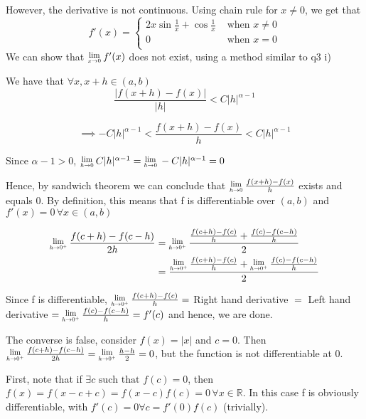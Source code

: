 \documentclass{article}
\newcommand{\Lim}[1]{\raisebox{0.5ex}{\scalebox{0.8}{$\displaystyle \lim_{#1}\;$}}}
\begin{document}
        However, the derivative is not continuous. Using chain rule for $x\neq 0$, we get that 
        $$f'(x) = \begin{cases}
                    2x \sin \frac{1}{x}+ \cos \frac{1}{x} &  \text{ when } x \neq 0\\
                    0 &  \text{ when } x = 0\\
                \end{cases}
                $$
                We can show that $\Lim{x\to 0} f'(x)$ does not exist, using a method similar to q3 i)

        \item We have that $\forall x,x+h \in (a,b)$
                $$\frac{|f(x+h) - f(x)|}{|h|} < C |h|^{\alpha-1}$$

                $$\implies -C|h|^{\alpha-1} < \frac{f(x+h) - f(x)}{h} < C |h|^{\alpha-1}$$

                Since $\alpha -1 > 0$, $\Lim{h \to 0} C|h|^{\alpha-1} = \Lim{h \to 0} -C|h|^{\alpha-1} = 0$

                Hence, by sandwich theorem we can conclude that $\Lim{h\to 0}\frac{f(x+h) - f(x)}{h}$ exists and equals $0$. By definition, this means that f is differentiable over $(a, b)$ and $f'(x) = 0 \, \forall x \in (a,b)$

        \item

                \begin{align*}\Lim{h\to 0^+} \frac{f(c+h) - f(c-h)}{2h} &= \Lim{h\to 0^+}\frac{\frac{f(c+h)-f(c)}{h} + \frac{f(c) - f(c-h)}{h}}{2}\\ 
                                                                       &= \frac{\Lim{h\to 0^+}\frac{f(c+h)-f(c)}{h} + \Lim{h\to 0^+}\frac{f(c) - f(c-h)}{h}}{2}\\
                \end{align*}
               
                Since f is differentiable, $\Lim{h\to 0^+}\frac{f(c+h)-f(c)}{h} = $ Right hand derivative $ = $ Left hand derivative $ = \Lim{h\to 0^+}\frac{f(c) - f(c-h)}{h} = f'(c)$ and hence, we are done.

                The converse is false, consider $f(x) = |x|$ and $c = 0$. Then $\Lim{h\to 0^+} \frac{f(c+h) - f(c-h)}{2h} = \Lim{h\to 0^+}\frac{h - h}{2} = 0$, but the function is not differentiable at 0.
        \item First, note that if $\exists c  \text{ such that } f(c) = 0$, then $f(x) = f(x-c+c) =f(x-c)f(c) = 0\, \forall x \in \mathbb{R}$. In this case f is obviously differentiable, with $f'(c) = 0 \forall c = f'(0)f(c)$ (trivially).
\end{document}
